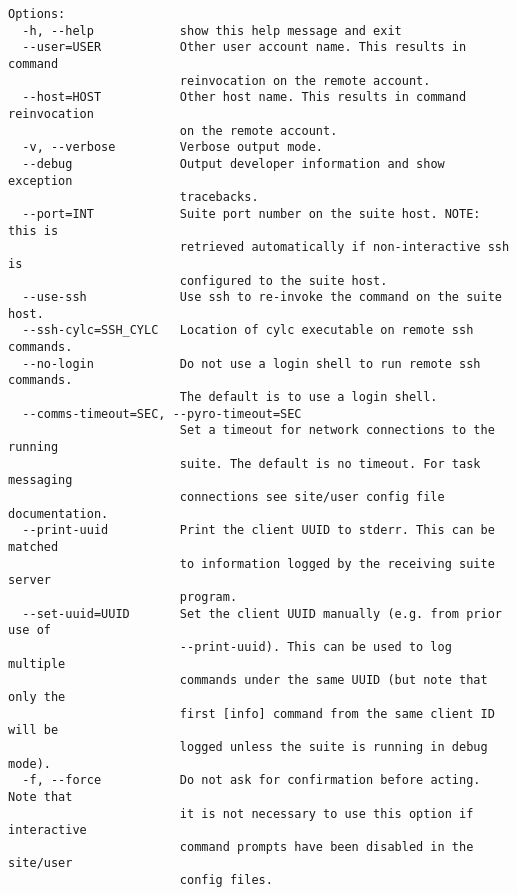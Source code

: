\begin{lstlisting}
Options:
  -h, --help            show this help message and exit
  --user=USER           Other user account name. This results in command
                        reinvocation on the remote account.
  --host=HOST           Other host name. This results in command reinvocation
                        on the remote account.
  -v, --verbose         Verbose output mode.
  --debug               Output developer information and show exception
                        tracebacks.
  --port=INT            Suite port number on the suite host. NOTE: this is
                        retrieved automatically if non-interactive ssh is
                        configured to the suite host.
  --use-ssh             Use ssh to re-invoke the command on the suite host.
  --ssh-cylc=SSH_CYLC   Location of cylc executable on remote ssh commands.
  --no-login            Do not use a login shell to run remote ssh commands.
                        The default is to use a login shell.
  --comms-timeout=SEC, --pyro-timeout=SEC
                        Set a timeout for network connections to the running
                        suite. The default is no timeout. For task messaging
                        connections see site/user config file documentation.
  --print-uuid          Print the client UUID to stderr. This can be matched
                        to information logged by the receiving suite server
                        program.
  --set-uuid=UUID       Set the client UUID manually (e.g. from prior use of
                        --print-uuid). This can be used to log multiple
                        commands under the same UUID (but note that only the
                        first [info] command from the same client ID will be
                        logged unless the suite is running in debug mode).
  -f, --force           Do not ask for confirmation before acting. Note that
                        it is not necessary to use this option if interactive
                        command prompts have been disabled in the site/user
                        config files.
\end{lstlisting}
